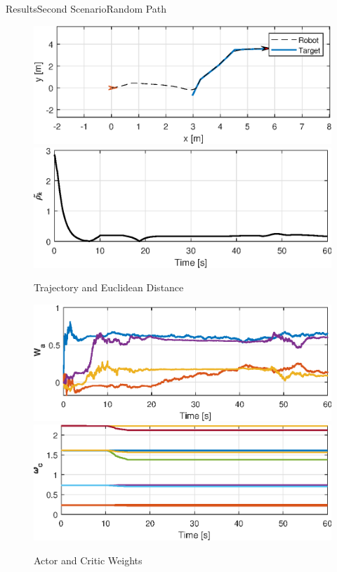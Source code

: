 \documentclass{beamer}
\begin{document}
\begin{frame}{Results}{Second Scenario}{Random Path}
\begin{figure} 
{\includegraphics[scale=0.4]{figs/matlab/Random/trajectoryRandom.eps}}
{\includegraphics[scale=0.4]{figs/matlab/Random/euclideanDistanceRandom.eps}}
\caption{Trajectory and Euclidean Distance}
\end{figure}
\begin{figure}
{\includegraphics[scale=0.4]{figs/matlab/Random/weightActorRandom.eps}}
{\includegraphics[scale=0.4]{figs/matlab/Random/weightRandom.eps}}
\caption{Actor and Critic Weights}
\end{figure}
\end{frame}
\end{document}
